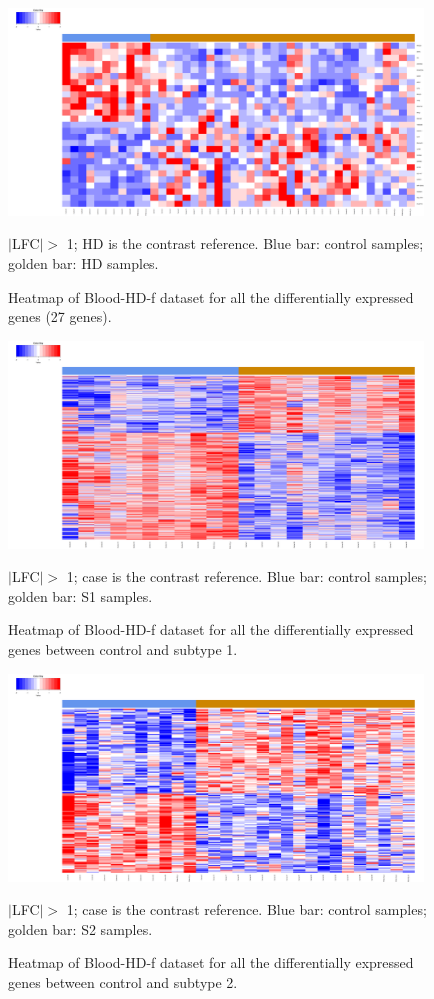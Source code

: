 
\begin{figure}[!ht]
    \centerline{\includegraphics[width = 11cm]{Figures/DE heatmap/CTLvsHD-Blood-f_27.png}}
\caption{Heatmap of Blood-HD-f dataset for all the differentially expressed genes (27 genes).}
\label{DE-blood-hd-f}
\footnotesize $|$LFC$| >$ 1; HD is the contrast reference. Blue bar: control samples; golden bar: HD samples.
\end{figure}

\begin{figure}[!ht]
    \centerline{\includegraphics[width = 11cm]{Figures/DE heatmap/CTLvs1_HD-Blood-f_all.png}}
\caption{Heatmap of Blood-HD-f dataset for all the differentially expressed genes between control and subtype 1.}
\footnotesize $|$LFC$| >$ 1; case is the contrast reference. Blue bar: control samples; golden bar: S1 samples.
\end{figure}

\begin{figure}[!ht]
    \centerline{\includegraphics[width = 11cm]{Figures/DE heatmap/CTLvs2_HD-Blood-f_all.png}}
\caption{Heatmap of Blood-HD-f dataset for all the differentially expressed genes between control and subtype 2.}
\footnotesize $|$LFC$| >$ 1; case is the contrast reference. Blue bar: control samples; golden bar: S2 samples.
\end{figure}

